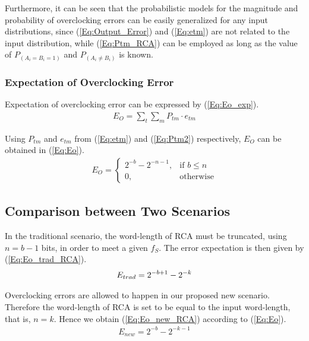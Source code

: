 \documentclass[prodmode,acmtrets]{acmsmall} %
\begin{document}
Furthermore, it can be seen that the probabilistic models for the magnitude and probability of overclocking errors can be easily generalized for any input distributions, since (\ref{Eq:Output_Error}) and (\ref{Eq:etm}) are not related to the input distribution, while (\ref{Eq:Ptm_RCA}) can be employed as long as the value of $P_{(A_i=B_i=1)}$ and $P_{(A_i\neq B_i)}$ is known.

\subsubsection{Expectation of Overclocking Error}
Expectation of overclocking error can be expressed by (\ref{Eq:Eo_exp}).
%
\begin{eqnarray}\label{Eq:Eo_exp}
    E_O=\sum_{t}\sum_{m}P_{tm}\cdot e_{tm}
\end{eqnarray}

Using $P_{tm}$ and $e_{tm}$ from (\ref{Eq:etm}) and (\ref{Eq:Ptm2}) respectively, $E_O$ can be obtained in (\ref{Eq:Eo}).
%
\begin{eqnarray}\label{Eq:Eo}
      E_O=\left\{
        \begin{matrix}
            2^{-b}-2^{-n-1}, & \textrm{if $b\leq n$}\\
            0, & \textrm{otherwise}
        \end{matrix}
      \right.
\end{eqnarray}

\subsection{Comparison between Two Scenarios}\label{section_RCA_Comparison}
In the traditional scenario, the word-length of RCA must be truncated, using $n=b-1$ bits, in order to meet a given $f_S$. The error expectation is then given by (\ref{Eq:Eo_trad_RCA}).
%
\begin{eqnarray}\label{Eq:Eo_trad_RCA}
  E_{trad}=2^{-b+1}-2^{-k}
  \vspace{-1ex}
\end{eqnarray}

Overclocking errors are allowed to happen in our proposed new scenario. Therefore the word-length of RCA is set to be equal to the input word-length, that is, $n=k$. Hence we obtain (\ref{Eq:Eo_new_RCA}) according to (\ref{Eq:Eo}).
%
\begin{eqnarray}\label{Eq:Eo_new_RCA}
  E_{new}=2^{-b}-2^{-k-1}
\end{eqnarray}
\end{document}
